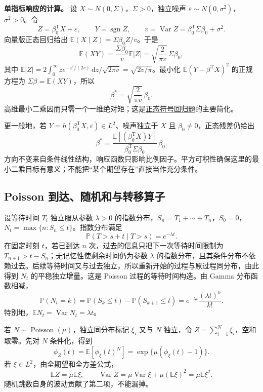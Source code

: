 \documentclass[UTF8,12pt,a4paper,fontset=fandol]{ctexbook}
\begin{document}
\textbf{单指标响应的计算。} 设 $X\sim N(0,\Sigma)$，$\Sigma>0$，独立噪声 $\varepsilon\sim N(0,\sigma^2)$，$\sigma^2>0$。令
\[
Z=\beta_0^{\mathrm T}X+\varepsilon,\qquad Y=\operatorname{sgn}Z,
\qquad v=\operatorname{Var}Z=\beta_0^{\mathrm T}\Sigma\beta_0+\sigma^2.
\]
向量版正态回归给出 $\mathbb E(X\mid Z)=\Sigma\beta_0 Z/v$。于是
\[
\mathbb E(XY)=\frac{\Sigma\beta_0}{v}\mathbb E|Z|
=\sqrt{\frac2{\pi v}}\,\Sigma\beta_0,
\]
其中 $\mathbb E|Z|=2\int_0^\infty z e^{-z^2/(2v)}\,\mathrm dz/\sqrt{2\pi v}=\sqrt{2v/\pi}$。最小化 $\mathbb E(Y-\beta^{\mathrm T}X)^2$ 的正规方程为 $\Sigma\beta=\mathbb E(XY)$，所以
\[
\beta^*=\sqrt{\frac2{\pi v}}\,\beta_0.
\]
高维最小二乘因而只需一个一维绝对矩；这是\hyperref[pr:fin13-high:12]{正态符号回归题}的主要简化。

更一般地，若 $Y=h(\beta_0^{\mathrm T}X,\varepsilon)\in L^2$、噪声独立于 $X$ 且 $\beta_0\ne0$，正态残差仍给出
\[
\beta^*=\frac{\mathbb E[(\beta_0^{\mathrm T}X)Y]}{\beta_0^{\mathrm T}\Sigma\beta_0}\,\beta_0.
\]
方向不变来自条件线性结构，响应函数只影响比例因子。平方可积性确保这里的最小二乘目标有意义；不能把“某个期望存在”直接当作充分条件。

\subsection{Poisson 到达、随机和与转移算子}

\label{app:probability-poisson}

设等待时间 $T_i$ 独立服从参数 $\lambda>0$ 的指数分布，$S_n=T_1+\cdots+T_n$，$S_0=0$，$N_t=\max\{n:S_n\le t\}$。指数分布满足
\[
\mathbb P(T>s+t\mid T>s)=e^{-\lambda t}.
\]
在固定时刻 $t$，若已到达 $n$ 次，过去的信息只把下一次等待时间限制为 $T_{n+1}>t-S_n$；无记忆性使剩余时间仍为参数 $\lambda$ 的指数分布，且其条件分布不依赖过去。后续等待时间又与过去独立，所以重新开始的过程与原过程同分布，由此得到 $N_t$ 的平稳独立增量。这是 Poisson 过程的等待时间构造。由 Gamma 分布函数相减，
\[
\mathbb P(N_t=k)=\mathbb P(S_k\le t)-\mathbb P(S_{k+1}\le t)
=e^{-\lambda t}\frac{(\lambda t)^k}{k!}.
\]
特别地，$\mathbb EN_t=\operatorname{Var}N_t=\lambda t$。

若 $N\sim\operatorname{Poisson}(\mu)$，独立同分布标记 $\xi_i$ 又与 $N$ 独立，令 $Z=\sum_{i=1}^N\xi_i$，空和取零。先对 $N$ 条件化，得到
\[
\phi_Z(t)=\mathbb E[\phi_\xi(t)^N]
=\exp\{\mu(\phi_\xi(t)-1)\}.
\]
若 $\xi\in L^2$，由全期望和全方差公式，
\[
\mathbb EZ=\mu\mathbb E\xi,\qquad
\operatorname{Var}Z=\mu\operatorname{Var}\xi+\mu(\mathbb E\xi)^2
=\mu\mathbb E\xi^2.
\]
随机跳数自身的波动贡献了第二项，不能漏掉。
\end{document}
